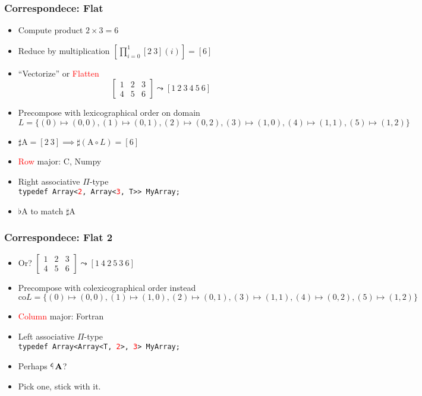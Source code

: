 \documentclass[xetex,mathserif,serif]{beamer}
\newcommand\mrm[1]{\mathrm{#1}}
\newcommand\brm[1]{\bm{\mrm{#1}}}
\newcommand\tlaf{\mathop{\rotatebox[origin=c]{180}{$\flat$}}}
\newcommand\NB[1]{\textcolor{red}{#1}}
\begin{document}
\begin{frame}
  \frametitle{Correspondece: Flat}
  \begin{itemize}%
    \item Compute product \(2 \times 3 = 6\)
    \item Reduce by multiplication \(\left[\prod_{i=0}^1 [2\ 3](i)\right] = [ 6 ]\)
    \item ``Vectorize'' or \NB{Flatten} \[
      \begin{bmatrix}
        1 & 2 & 3 \\
        4 & 5 & 6
      \end{bmatrix} \leadsto [1\ 2\ 3\ 4\ 5\ 6]
      \]
    \item Precompose with lexicographical order on domain $
      L = \{(0) \mapsto (0,0), (1)\mapsto (0,1), (2)\mapsto(0,2), (3)\mapsto(1,0), (4)\mapsto(1,1), (5)\mapsto(1,2)\}
      $
    \item \(\sharp \brm A = [2\ 3] \implies \sharp (\brm A \circ L) = [6] \)
    \item \NB{Row} major: C, Numpy
    \item Right associative \(\Pi\)-type\\
      \texttt{typedef Array<\NB 2, Array<\NB 3, T>> MyArray;}
    \item \(\flat \brm A\) to match \(\sharp \brm A\)
  \end{itemize}
\end{frame}

\begin{frame}
  \frametitle{Correspondece: Flat 2}
  \begin{itemize}%
    \item Or? $
      \begin{bmatrix}
        1 & 2 & 3 \\
        4 & 5 & 6
      \end{bmatrix} \leadsto [1\ 4\ 2\ 5\ 3\ 6]
      $ 
    \item Precompose with colexicographical order instead
      \(\mrm{co}L = \{ (0)\mapsto(0,0), (1)\mapsto(1,0), (2)\mapsto(0,1), (3)\mapsto(1,1), (4)\mapsto(0,2), (5)\mapsto(1,2) \}\)
    \item \NB{Column} major: Fortran
    \item Left associative \(\Pi\)-type \\
      \texttt{typedef Array<Array<T, \NB 2>, \NB 3> MyArray;}
    \item Perhaps \(\tlaf \brm A\)?
    \item Pick one, stick with it.
  \end{itemize}
\end{frame}
\end{document}
